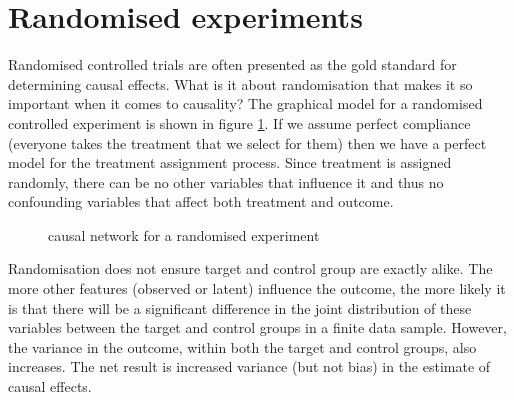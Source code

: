 \documentclass[11pt,a4paper,twoside]{report}
\theoremstyle{plain}
\theoremstyle{definition}
\begin{document}
\section{Randomised experiments}
\label{sec:randomized_experiment}
Randomised controlled trials are often presented as the gold standard for determining causal effects. What is it about randomisation that makes it so important when it comes to causality? The graphical model for a randomised controlled experiment is shown in figure \ref{fig:random_experiment_network}. If we assume perfect compliance (everyone takes the treatment that we select for them) then we have a perfect model for the treatment assignment process. Since treatment is assigned randomly, there can be no other variables that influence it and thus no confounding variables that affect both treatment and outcome. 

\begin{figure}
\centering
{}
\caption{causal network for a randomised experiment}
\label{fig:random_experiment_network}
\end{figure} 

Randomisation does not ensure target and control group are exactly alike. The more other features (observed or latent) influence the outcome, the more likely it is that there will be a significant difference in the joint distribution of these variables between the target and control groups in a finite data sample. However, the variance in the outcome, within both the target and control groups, also increases. The net result is increased variance (but not bias) in  the estimate of causal effects. 
\end{document}
